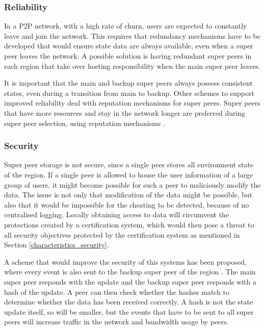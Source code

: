 \subsubsection{Reliability}
\label{super_peer_storage_reliability}

In a P2P network, with a high rate of churn, users are expected to constantly leave and join the network. This requires that redundancy mechanisms have to be developed that would ensure state data are always available, even when a super peer leaves the network. A possible solution is having redundant super peers in each region that take over hosting responsibility when the main super peer leaves.

It is important that the main and backup super peers always possess consistent states, even during a transition from main to backup. Other schemes to support improved reliability deal with reputation mechanisms for super peers. Super peers that have more resources and stay in the network longer are preferred during super peer selection, using reputation mechanisms \cite{fan_mediator_paper}.

\subsubsection{Security}

Super peer storage is not secure, since a single peer stores all environment state of the region. If a single peer is allowed to house the user information of a large group of users, it might become possible for such a peer to maliciously modify the data. The issue is not only that modification of the data might be possible, but also that it would be impossible for the cheating to be detected, because of no centralised logging. Locally obtaining access to data will circumvent the protections created by a certification system, which would then pose a threat to all security objectives protected by the certification system as mentioned in Section \ref{characteristics_security}.

A scheme that would improve the security of this systems has been proposed, where every event is also sent to the backup super peer of the region \cite{past_storage_focus}. The main super peer responds with the update and the backup super peer responds with a hash of the update. A peer can then check whether the hashes match to determine whether the data has been received correctly. A hash is not the state update itself, so will be smaller, but the events that have to be sent to all super peers will increase traffic in the network and bandwidth usage by peers.

